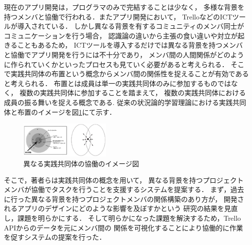 
現在のアプリ開発は，プログラマのみで完結することは少なく，
多様な背景を持つメンバと協働で行われる．またアプリ開発において，
Trello\cite{trello}などのICTツールが導入されている．
しかし異なる背景を有するコミュニティのメンバ同士がコミュニケーションを行う場合，
認識論の違いから主張の食い違いや対立が起きることもあるため\cite{conflict}，
ICTツールを導入するだけでは異なる背景を持つメンバと協働でアプリ開発を行うには不十分であり，
メンバ間の人間関係がどのように作られていくかといったプロセスも見ていく必要があると考えられる．
そこで実践共同体\cite{Matsumoto}の布置という概念からメンバ間の関係性を捉えることが有効であると考えられる．
布置とは成員は単一の実践共同体のみに参加するものではなく，
複数の実践共同体に参加することを踏まえて，
複数の実践共同体における成員の振る舞いを捉える概念である.
従来の状況論的学習理論における実践共同体\cite{copImg}と布置のイメージを図\ref{cop-overlap}にて示す．

\begin{figure}[h]
  \centering
  \includegraphics[width=0.4\textwidth]{img/cop-overlap.eps}
  \caption{異なる実践共同体の協働のイメージ図}
  \label{cop-overlap}
\end{figure}

そこで，著者らは実践共同体の概念を用いて，
異なる背景を持つプロジェクトメンバが協働でタスクを行うことを支援するシステムを提案する．
まず，過去に行った異なる背景を持つプロジェクトメンバの関係構築のあり方が，
開発されるアプリのデザインにどのような影響を及ぼすかという
研究の結果を見直し，課題を明らかにする．
そして明らかになった課題を解決するため，Trello APIからのデータを元にメンバ間の
関係を可視化することにより協働的に作業を促すシステムの提案を行った．
